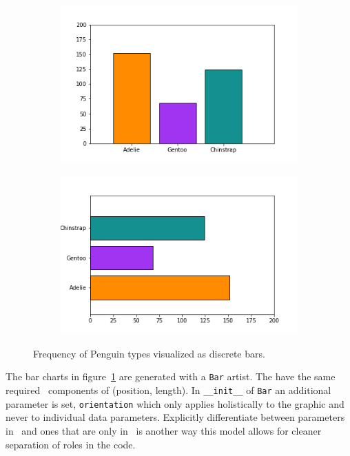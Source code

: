 \documentclass[../main.tex]{subfiles}
\begin{document}
\begin{figure}[H]
    \begin{subfigure}{0.5\textwidth}
        \includegraphics[width=\textwidth]{figures/code/bar_v.png}
    \end{subfigure}
    \begin{subfigure}{0.5\textwidth}
        \includegraphics[width=\textwidth]{figures/code/bar_h.png}
    \end{subfigure}
    \caption{Frequency of Penguin types visualized as discrete bars. }
    \label{fig:code_bar_simple}
\end{figure}
The bar charts in figure~\ref{fig:code_bar_simple} are generated with a \texttt{Bar} artist. The have the same required \vfiber\ components of (position, length). In \texttt{__init__} of \texttt{Bar} an additional parameter is set, \texttt{orientation} which only applies holistically to the graphic and never to individual data parameters. Explicitly differentiate between parameters in \vtotal\ and ones that are only in \vmarkd\ is another way this model allows for cleaner separation of roles in the code. 
\end{document}
